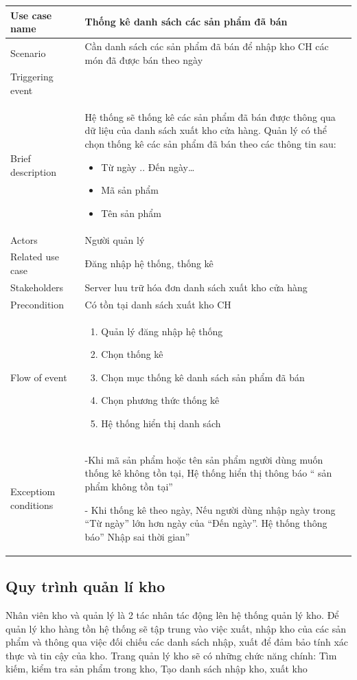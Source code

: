 \documentclass{article}
\begin{document}
		\begin{tabular}{|m{4cm}|m{12cm}|}
		\hline
		Use case name & Thống kê danh sách các sản phẩm đã bán\\
		\hline
		Scenario & Cần danh sách các sản phẩm đã bán để nhập kho CH các món đã được bán theo ngày \\
		\hline
		Triggering event & \\
		\hline
		Brief description & Hệ thống sẽ thống kê các sản phẩm đã bán được thông qua dữ liệu của danh sách xuất kho cửa hàng. Quản lý có thể chọn thống kê các sản phẩm đã bán theo các thông tin sau:
		\begin{itemize}
			\item Từ ngày .. Đến ngày…
			\item Mã sản phẩm
			\item Tên sản phẩm
		\end{itemize}\\
		\hline
		 Actors & Người quản lý\\
		\hline
		Related use case & Đăng nhập hệ thống, thống kê\\
		\hline
		Stakeholders & Server luu trữ hóa đơn danh sách xuất kho cửa hàng\\
		\hline
		Precondition & Có tồn tại danh sách xuất kho CH\\
		\hline
		Flow of event & 
			\begin{enumerate}
				\item Quản lý đăng nhập hệ thống 
				\item Chọn thống kê
				\item Chọn mục thống kê danh sách sản phẩm đã bán
				\item Chọn phương thức thống kê
				\item Hệ thống hiển thị danh sách

			\end{enumerate}\\
		\hline
		Exceptiom conditions & -Khi mã sản phẩm hoặc tên sản phẩm người dùng muốn thống kê không tồn tại, Hệ thống hiển thị thông báo “ sản phẩm không tồn tại”
		
- Khi thống kê theo ngày, Nếu người dùng nhập ngày trong “Từ ngày” lớn hơn ngày của “Đến ngày”. Hệ thống thông báo” Nhập sai thời gian”\\
		\hline
\end{tabular}

\fontsize{14}{20}\selectfont\subsection{Quy trình quản lí kho}
\fontsize{13}{20}\selectfont
Nhân viên kho và quản lý là 2 tác nhân tác động lên hệ thống quản lý kho. Để quản lý kho hàng tồn hệ thống sẽ tập trung vào việc xuất, nhập kho của các sản phẩm và thông qua việc đối chiếu các danh sách nhập, xuất để đảm bảo tính xác thực và tin cậy của kho. 
Trang quản lý kho sẽ có những chức năng chính: Tìm kiếm, kiểm tra sản phẩm trong kho, Tạo danh sách nhập kho, xuất kho
\end{document}
